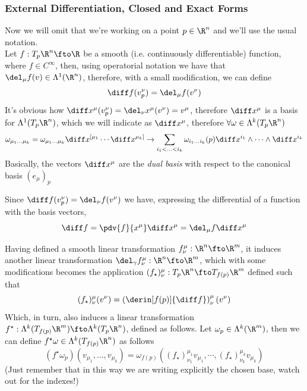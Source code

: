 \documentclass[../mmf.tex]{subfiles}
\begin{document}
\subsubsection{External Differentiation, Closed and Exact Forms}
\begin{dfn}[Differential]
	Now we will omit that we're working on a point $p\in\R^n$ and we'll use the usual notation.\\
	Let $f:T_p\R^n\fto\R$ be a smooth (i.e. continuously differentiable) function, where $f\in C^\infty$, then, using operatorial notation we have that $\del_\mu f(v)\in\Lambda^1(\R^n)$, therefore, with a small modification, we can define
	\begin{equation}
		\diff f(v^\nu_p)=\del_\mu f(v^\nu)
		\label{eq:differential1}
	\end{equation}
	It's obvious how $\diff x^\mu(v^\nu_p)=\del_\nu x^\mu(v^\nu)=v^\mu$, therefore $\diff x^\mu$ is a basis for $\Lambda^1(T_p\R^n)$, which we will indicate as $\diff x^\mu$, therefore $\forall\omega\in\Lambda^k(T_p\R^n)$
	\begin{equation}
		\omega_{\mu_1\ldots\mu_k}=\omega_{\mu_1\ldots\mu_k}\diff x^{[\mu_1}\cdots\diff x^{\mu_k]}\to\sum_{i_1<\ldots<i_k}\omega_{i_1\ldots i_k}(p)\diff x^{i_1}\wedge\cdots\wedge\diff x^{i_k}
		\label{eq:difform2}
	\end{equation}
	Basically, the vectors $\diff x^\mu$ are the \textit{dual basis} with respect to the canonical basis $(e_\mu)_p$
\end{dfn}
\begin{thm}
	Since $\diff f(v^\nu_p)=\del_\nu f(v^\nu)$ we have, expressing the differential of a function with the basis vectors,
	\begin{equation}
		\diff f=\pdv{f}{x^\mu}\diff x^\mu=\del_\mu f\diff x^\mu
		\label{eq:funcdiff}
	\end{equation}
\end{thm}
\begin{dfn}
	Having defined a smooth linear transformation $f^\mu_\nu:\R^n\fto\R^m$, it induces another linear transformation $\del_{\gamma}f^\mu_\nu:\R^n\fto\R^m$, which with some modifications becomes the application $(f_\star)^\mu_\nu:T_p\R^n\fto T_{f(p)}\R^m$ defined such that
	\begin{equation}
		(f_\star)^\mu_\nu(v^\nu)=\left(\derin[f(p)]{\diff f}\right)^\mu_\nu(v^\nu)
		\label{eq:fstarlowsmooth}
	\end{equation}
	Which, in turn, also induces a linear transformation $f^\star:\Lambda^k(T_{f(p)}\R^m)\fto\Lambda^k(T_p\R^n)$, defined as follows. Let $\omega_p\in\Lambda^k(\R^m)$, then we can define $f^\star\omega\in\Lambda^k(T_{f(p)}\R^n)$ as follows
	\begin{equation}
		(f^\star\omega_p)(v_{\mu_1},\ldots,v_{\mu_k})=\omega_{f(p)}\left( (f_\star)^{\mu_1}_{\nu_1}v_{\mu_1},\cdots,(f_\star)^{\mu_k}_{\nu_k}v_{\mu_k}\right)
		\label{eq:fstaromega}
	\end{equation}
	(Just remember that in this way we are writing explicitly the chosen base, watch out for the indexes!)
\end{dfn}
\end{document}
